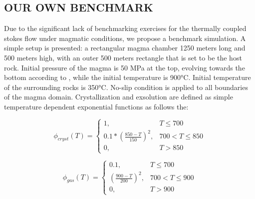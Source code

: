 \subsection{OUR OWN BENCHMARK}
Due to the significant lack of benchmarking exercises for the thermally coupled stokes flow under magmatic conditions, we propose a benchmark simulation. A simple setup is presented: a rectangular magma chamber 1250 meters long and 500 meters high, with an outer 500 meters rectangle that is set to be the host rock. Initial pressure of the magma is 50 MPa at the top, evolving towards the bottom according to  , while the initial temperature is 900°C. Initial temperature of the surrounding rocks is 350°C. No-slip condition is applied to all boundaries of the magma domain.  
Crystallization and exsolution are defined as simple temperature dependent exponential functions as follows the:


\begin{equation}   
    \phi_{cryst}(T) =
    \begin{cases} 
    1, & T \leq 700 \\
    0.1* \left(\frac{850 - T}{150} \right)^2, & 700 < T \leq 850 \\
    0, & T > 850
    \end{cases}
\end{equation}

\begin{equation}
    \phi_{gas}(T) =
    \begin{cases} 
    0.1, & T \leq 700 \\
    \left(\frac{900 - T}{200} \right)^2, & 700 < T \leq 900 \\
    0, & T > 900
    \end{cases}
\end{equation}

